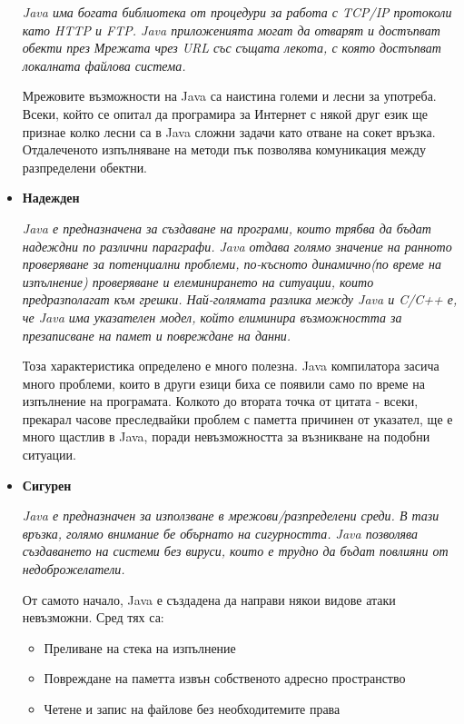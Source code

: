 \begin{itemize}
    \emph{Java има богата библиотека от процедури за работа с TCP/IP
    протоколи като HTTP и FTP. Java приложенията могат да отварят и
    достъпват обекти през Мрежата чрез URL със същата лекота, с която
    достъпват локалната файлова система.}

    Мрежовите възможности на Java са наистина големи и лесни за
    употреба. Всеки, който се опитал да програмира за Интернет с някой
    друг език ще признае колко лесни са в Java сложни задачи като
    отване на сокет връзка. Отдалеченото изпълняване на методи пък
    позволява комуникация между разпределени обектни.

  \item \textbf{Надежден}

    \emph{Java е предназначена за създаване на програми, които трябва да
    бъдат надеждни по различни параграфи. Java отдава голямо значение
    на ранното проверяване за потенциални проблеми, по-късното
    динамично(по време на изпълнение) проверяване и елеминирането на
    ситуации, които предразполагат към грешки. Най-голямата разлика
    между Java и C/C++ е, че Java има указателен модел, който
    елиминира възможността за презаписване на памет и повреждане на
    данни.}

  Тоза характеристика определено е много полезна. Java компилатора
  засича много проблеми, които в други езици биха се появили само по
  време на изпълнение на програмата. Колкото до втората точка от
  цитата - всеки, прекарал часове преследвайки проблем с паметта
  причинен от указател, ще е много щастлив в Java, поради
  невъзможността за възникване на подобни ситуации.

\item \textbf{Сигурен} 

  \emph{Java е предназначен за използване в мрежови/разпределени среди. В
  тази връзка, голямо внимание бе обърнато на сигурността. Java
  позволява създаването на системи без вируси, които е трудно да бъдат
  повлияни от недоброжелатели.}

От самото начало, Java е създадена да направи някои видове атаки
невъзможни. Сред тях са:

\begin{itemize}
\item Преливане на стека на изпълнение
\item Повреждане на паметта извън собственото адресно пространство
\item Четене и запис на файлове без необходитемите права
\end{itemize} 


\end{itemize}
